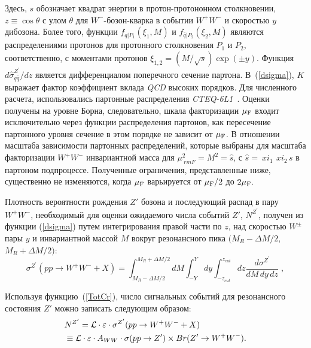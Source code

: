 Здесь, $s$ обозначает квадрат энергии в протон-протононном столкновении,
$z\equiv\cos\theta$ с улом $\theta$ для $W^-$-бозон-кварка в событии $W^+W^-$ и скоростью $y$ дибозона. Более того, функции $f_{q|P_1}(\xi_{1},M)$ и $f_{\bar
	q|P_2}(\xi_{2},M)$ являются распределениями протонов для
протонного столкновения $P_1$ и $P_2$, соответственно, с моментами протонов $\xi_{1,2}=(M/\sqrt
s)\exp(\pm y)$. Функция ${d\hat
	\sigma_{q \bar q}^{Z^\prime}}/{dz}$ является дифференциалом
поперечного сечение партона. В~(\ref{dsigma}), $K$ выражает фактор коэффициент вклада \textit{QCD} высоких порядков.
Для численного расчета, использовались партонные распределения \textit{CTEQ-6L1}~\cite{2part-pankov}. Оценки получены на уровне Борна,
следовательно, шкала факторизации $ \mu_{\rm F} $ входит исключительно через
функции распределения партонов, как пересечение партонного уровня
сечение в этом порядке не зависит от $ \mu_{\rm F} $. В отношении
масштаба зависимости партонных распределений, которые выбраны для
масштаба факторизации $ W ^ + W ^ - $ инвариантной масса для $ \mu _ {\ rm
	F} ^ 2 = M ^ 2 = \hat {s} $, с $ \hat {s} = \ xi_1 \, \ xi_2 \, s $ в партоном
подпроцессе. Полученные ограничения, представленные ниже, существенно не изменяются, когда
$ \mu _ {\rm F} $ варьируется от $ \mu _ {\rm F} / 2 $ до $ 2 \mu _ {\rm F}. $

Плотность вероятности рождения $ Z '$ бозона и
последующий распад в пару $ W ^ + W ^ - $, необходимый для оценки
ожидаемого числа событий $ Z '$, $ N ^ {Z ^ \prime} $, получен
из функции (\ref{dsigma}) путем интегрирования правой части по $ z $,
над скоростью $ W ^ \pm $ пары $ y $ и инвариантной массой $ M $
вокруг резонансного пика $ (M_R- \Delta M / 2, $ $ M_R + \Delta M / 2) $:
\begin{equation}
\sigma^{Z^\prime}{(pp\to W^+W^- + X)}  =\int_{M_{R}-\Delta
	M/2}^{M_{R}+\Delta M/2}d M \int_{-Y}^{Y}d y
\int_{-z_{cut}}^{z_{cut}}d
z\frac{d\sigma^{Z^\prime}}{d M\, d y\, d z}\;, \label{TotCr}
\end{equation}

Используя функцию~(\ref{TotCr}), число сигнальных событий для резонансного состояния $ Z '$ можно записать следующим образом:
\begin{align}
&N^{Z^\prime}= {\cal L}\cdot\varepsilon\cdot
\sigma^{Z^\prime}{(pp\to W^+W^- + X)}\nonumber \\ &\equiv {\cal
	L}\cdot\varepsilon\cdot A_{WW}\cdot \sigma(pp\to Z') \times {Br}(Z' \to W^+W^-).
\label{signal}
\end{align}

